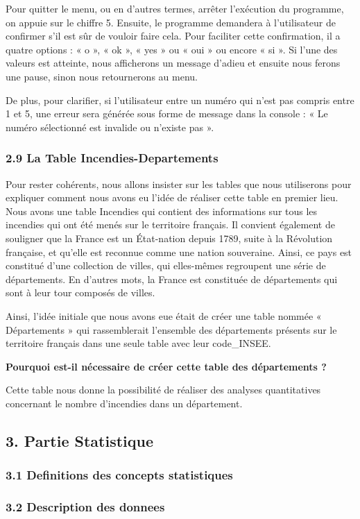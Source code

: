 \documentclass[
]{article}
\begin{document}
Pour quitter le menu, ou en d'autres termes, arrêter l'exécution du
programme, on appuie sur le chiffre 5. Ensuite, le programme demandera à
l'utilisateur de confirmer s'il est sûr de vouloir faire cela. Pour
faciliter cette confirmation, il a quatre options : « o », « ok », « yes
» ou « oui » ou encore « si ». Si l'une des valeurs est atteinte, nous
afficherons un message d'adieu et ensuite nous ferons une pause, sinon
nous retournerons au menu.

De plus, pour clarifier, si l'utilisateur entre un numéro qui n'est pas
compris entre 1 et 5, une erreur sera générée sous forme de message dans
la console : « Le numéro sélectionné est invalide ou n'existe pas ».

\subsubsection{2.9 La Table
Incendies-Departements}\label{la-table-incendies-departements}

Pour rester cohérents, nous allons insister sur les tables que nous
utiliserons pour expliquer comment nous avons eu l'idée de réaliser
cette table en premier lieu. Nous avons une table Incendies qui contient
des informations sur tous les incendies qui ont été menés sur le
territoire français. Il convient également de souligner que la France
est un État-nation depuis 1789, suite à la Révolution française, et
qu'elle est reconnue comme une nation souveraine. Ainsi, ce pays est
constitué d'une collection de villes, qui elles-mêmes regroupent une
série de départements. En d'autres mots, la France est constituée de
départements qui sont à leur tour composés de villes.

Ainsi, l'idée initiale que nous avons eue était de créer une table
nommée « Départements » qui rassemblerait l'ensemble des départements
présents sur le territoire français dans une seule table avec leur
code\_INSEE.

\textbf{Pourquoi est-il nécessaire de créer cette table des départements
?}

Cette table nous donne la possibilité de réaliser des analyses
quantitatives concernant le nombre d'incendies dans un département.

\subsection{3. Partie Statistique}\label{partie-statistique}

\subsubsection{3.1 Definitions des concepts
statistiques}\label{definitions-des-concepts-statistiques}

\subsubsection{3.2 Description des
donnees}\label{description-des-donnees}
\end{document}
